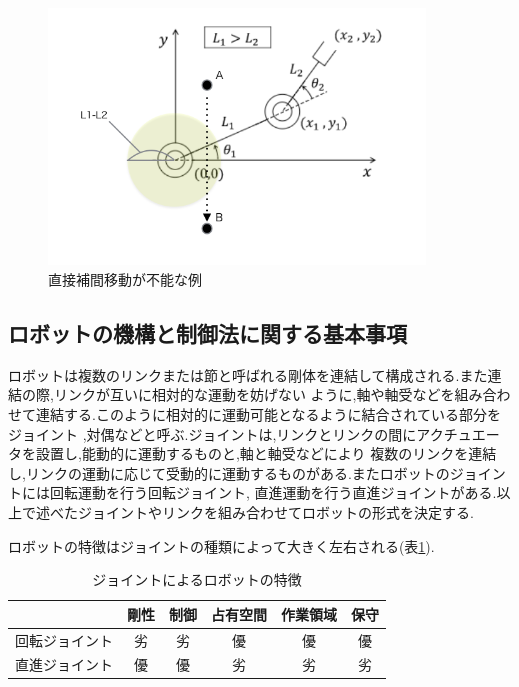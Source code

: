 \documentclass[a4paper,11pt]{jsarticle}
\begin{document}
\begin{figure}[H]
  \begin{center}
    \includegraphics[width = 10cm]{画像/直接補間.png}
    \caption{直接補間移動が不能な例}
    \label{直接補間}
  \end{center}
\end{figure}

\subsection{ロボットの機構と制御法に関する基本事項}
ロボットは複数のリンクまたは節と呼ばれる剛体を連結して構成される.また連結の際,リンクが互いに相対的な運動を妨げない
ように,軸や軸受などを組み合わせて連結する.このように相対的に運動可能となるように結合されている部分をジョイント
,対偶などと呼ぶ.ジョイントは,リンクとリンクの間にアクチュエータを設置し,能動的に運動するものと,軸と軸受などにより
複数のリンクを連結し,リンクの運動に応じて受動的に運動するものがある.またロボットのジョイントには回転運動を行う回転ジョイント,
直進運動を行う直進ジョイントがある.以上で述べたジョイントやリンクを組み合わせてロボットの形式を決定する.
\par
ロボットの特徴はジョイントの種類によって大きく左右される(表\ref{ジョイント表}).

\begin{table}[H]
	\caption{ジョイントによるロボットの特徴}
	\label{ジョイント表}
	\begin{center}
		\begin{tabular}{c|c|c|c|c|c}\hline
		   & 剛性 & 制御 & 占有空間 & 作業領域 & 保守 \\ \hline
			回転ジョイント & 劣 & 劣 & 優 & 優 & 優\\ \hline
			直進ジョイント & 優 & 優 & 劣 & 劣 & 劣 \\ \hline
	   \end{tabular}
\end{center}
\end{table}
\end{document}
